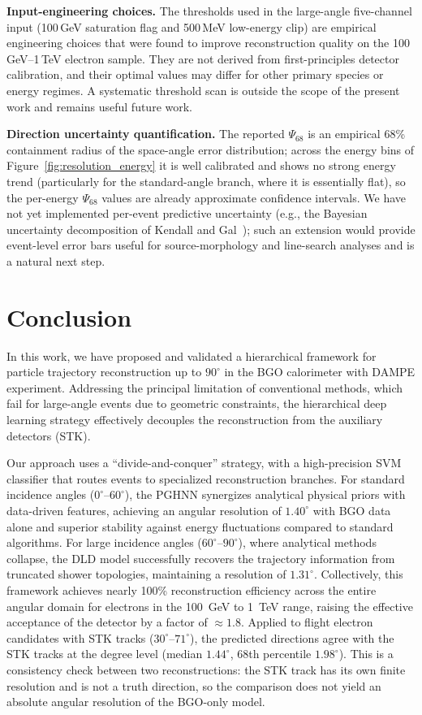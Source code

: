 \documentclass[preprint,12pt]{elsarticle}
\begin{document}
\textbf{Input-engineering choices.} The thresholds used in the large-angle five-channel input (100\,GeV saturation flag and 500\,MeV low-energy clip) are empirical engineering choices that were found to improve reconstruction quality on the 100\,GeV--1\,TeV electron sample. They are not derived from first-principles detector calibration, and their optimal values may differ for other primary species or energy regimes. A systematic threshold scan is outside the scope of the present work and remains useful future work.

\textbf{Direction uncertainty quantification.} The reported $\Psi_{68}$ is an empirical 68\% containment radius of the space-angle error distribution; across the energy bins of Figure~\ref{fig:resolution_energy} it is well calibrated and shows no strong energy trend (particularly for the standard-angle branch, where it is essentially flat), so the per-energy $\Psi_{68}$ values are already approximate confidence intervals. We have not yet implemented per-event predictive uncertainty (e.g., the Bayesian uncertainty decomposition of Kendall and Gal~\cite{kendall_2017}); such an extension would provide event-level error bars useful for source-morphology and line-search analyses and is a natural next step.

\section{Conclusion}
\label{sec:conclusion}

In this work, we have proposed and validated a hierarchical framework for particle trajectory reconstruction up to $90^{\circ}$ in the BGO calorimeter with DAMPE experiment. Addressing the principal limitation of conventional methods, which fail for large-angle events due to geometric constraints, the hierarchical deep learning strategy effectively decouples the reconstruction from the auxiliary detectors (STK).

Our approach uses a ``divide-and-conquer'' strategy, with a high-precision SVM classifier that routes events to specialized reconstruction branches. For standard incidence angles ($0^{\circ}$--$60^{\circ}$), the PGHNN synergizes analytical physical priors with data-driven features, achieving an angular resolution of $1.40^{\circ}$ with BGO data alone and superior stability against energy fluctuations compared to standard algorithms. For large incidence angles ($60^{\circ}$--$90^{\circ}$), where analytical methods collapse, the DLD model successfully recovers the trajectory information from truncated shower topologies, maintaining a resolution of $1.31^{\circ}$. Collectively, this framework achieves nearly 100\% reconstruction efficiency across the entire angular domain for electrons in the 100~GeV to 1~TeV range, raising the effective acceptance of the detector by a factor of $\approx 1.8$. Applied to flight electron candidates with STK tracks ($30^{\circ}$--$71^{\circ}$), the predicted directions agree with the STK tracks at the degree level (median $1.44^{\circ}$, 68th percentile $1.98^{\circ}$). This is a consistency check between two reconstructions: the STK track has its own finite resolution and is not a truth direction, so the comparison does not yield an absolute angular resolution of the BGO-only model.
\end{document}
